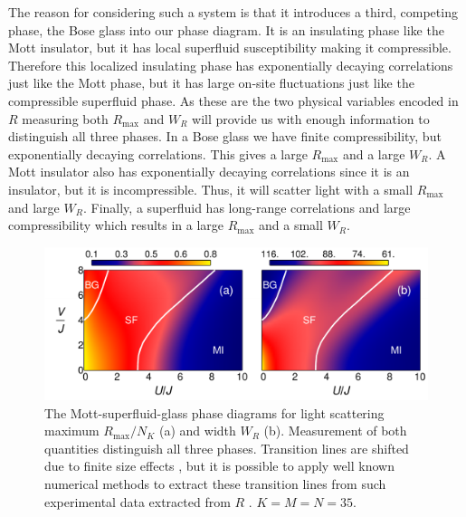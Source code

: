 The reason for considering such a system is that it introduces a
third, competing phase, the Bose glass into our phase diagram. It is
an insulating phase like the Mott insulator, but it has local
superfluid susceptibility making it compressible. Therefore this
localized insulating phase has exponentially decaying correlations
just like the Mott phase, but it has large on-site fluctuations just
like the compressible superfluid phase. As these are the two physical
variables encoded in $R$ measuring both $R_\text{max}$ and $W_R$ will
provide us with enough information to distinguish all three phases. In
a Bose glass we have finite compressibility, but exponentially
decaying correlations. This gives a large $R_\text{max}$ and a large
$W_R$. A Mott insulator also has exponentially decaying correlations
since it is an insulator, but it is incompressible. Thus, it will
scatter light with a small $R_\text{max}$ and large $W_R$. Finally, a
superfluid has long-range correlations and large compressibility which
results in a large $R_\text{max}$ and a small $W_R$.

\begin{figure}  
  \centering
  \includegraphics[width=\linewidth]{oph22_3}
  \caption[Mapping the Disoredered Phase Diagram]{The
    Mott-superfluid-glass phase diagrams for light scattering maximum
    $R_\text{max}/N_K$ (a) and width $W_R$ (b). Measurement of both
    quantities distinguish all three phases. Transition lines are
    shifted due to finite size effects \cite{roux2008}, but it is
    possible to apply well known numerical methods to extract these
    transition lines from such experimental data extracted from $R$
    \cite{ejima2011}. $K=M=N=35$.}
  \label{fig:BG}
\end{figure}

